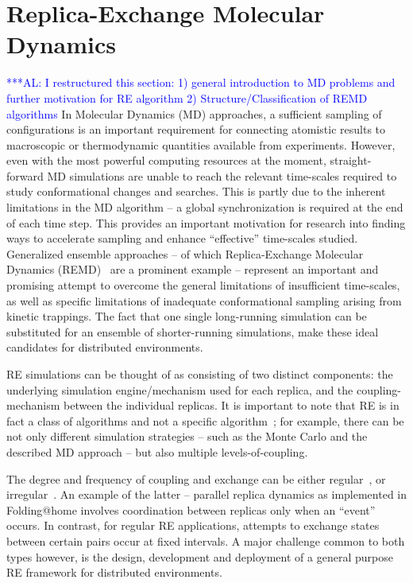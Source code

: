 \documentclass{rspublic}
\newcommand{\alnote}[1]{ {\textcolor{blue} { ***AL: #1 }}}
\newcommand{\alnote}[1]{}
\begin{document}
\section{Replica-Exchange Molecular Dynamics}
\alnote{I restructured this section: 1) general introduction to MD
  problems and further motivation for RE algorithm 2)
  Structure/Classification of REMD algorithms}  In Molecular
Dynamics (MD) approaches, a sufficient sampling of configurations is
an important requirement for connecting atomistic results to
macroscopic or thermodynamic quantities available from experiments.
However, even with the most powerful computing resources at the
moment, straight-forward MD simulations are unable to reach the
relevant time-scales required to study conformational changes and
searches. This is partly due to the inherent limitations in the MD
algorithm -- a global synchronization is required at the end of each
time step.  This provides an important motivation for research into
finding ways to accelerate sampling and enhance ``effective''
time-scales studied. Generalized ensemble approaches -- of which
Replica-Exchange Molecular Dynamics (REMD)~\citep{Sugita:1999rm} are a
prominent example -- represent an important and promising attempt to
overcome the general limitations of insufficient time-scales, as well
as specific limitations of inadequate conformational sampling arising
from kinetic trappings.  The fact that one single long-running
simulation can be substituted for an ensemble of shorter-running
simulations, make these ideal candidates for distributed environments.

RE simulations can be thought of as consisting of
two distinct components: the underlying simulation engine/mechanism
used for each replica, and the coupling-mechanism between the
individual replicas.  It is important to note that RE is in fact a
class of algorithms and not a specific
algorithm~\citep{dpa-paper}; for example, there can be not only
different simulation strategies -- such as the Monte Carlo and the
described MD approach -- but also multiple levels-of-coupling.  

The degree and frequency of coupling and exchange can be either
regular~\citep{hansmann,Sugita:1999rm}, or
irregular~\citep{SPdynamics,pande_bj03}. An example of the latter --
parallel replica dynamics as implemented in Folding@home
\citep{folding} involves coordination between replicas only when an
``event'' occurs.  In contrast, for regular RE applications, attempts
to exchange states between certain pairs occur at fixed intervals. A
major challenge common to both types however, is the design,
development and deployment of a general purpose RE framework for
distributed environments.
\end{document}

